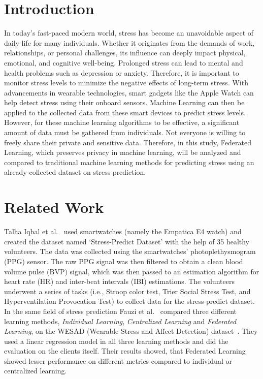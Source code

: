 \documentclass[
   fontsize=10.5pt,
   invert-title=true,
   titlepage=false,
   titleimage-ratio=13,
   class=article,
   twocolumn,
   parskip=half-
]{bfhpub}				%
\begin{document}
\section{Introduction}
In today's fast-paced modern world, stress has become an unavoidable aspect of
daily life for many individuals. Whether it originates from the demands of work,
relationships, or personal challenges, its influence can deeply impact physical,
emotional, and cognitive well-being. Prolonged stress can lead to mental and
health problems such as depression or anxiety. Therefore, it is important to
monitor stress levels to minimize the negative effects of long-term stress. With
advancements in wearable technologies, smart gadgets like the Apple Watch can
help detect stress using their onboard sensors. Machine Learning can then be
applied to the collected data from these smart devices to predict stress levels.
However, for these machine learning algorithms to be effective, a significant
amount of data must be gathered from individuals. Not everyone is willing to
freely share their private and sensitive data. Therefore, in this study,
Federated Learning, which preserves privacy in machine learning, will be
analyzed and compared to traditional machine learning methods for predicting
stress using an already collected dataset on stress prediction.

\section{Related Work}
Talha Iqbal et al.~\cite{iqbal_stress_2022} used smartwatches (namely the
Empatica E4 watch) and created the dataset named `Stress-Predict Dataset' with
the help of 35 healthy volunteers. The data was collected using the smartwatches'
photoplethysmogram (PPG) sensor. The raw PPG signal was then filtered to
obtain a clean blood volume pulse (BVP) signal, which was then passed to an
estimation algorithm for heart rate (HR) and inter-beat intervals (IBI)
estimations. The volunteers underwent a series of tasks (i.e., Stroop color
test, Trier Social Stress Test, and Hyperventilation Provocation Test) to collect
data for the stress-predict dataset. In the same field of stress prediction
Fauzi et al.~\cite{fauzi_comparative_2022} compared three different learning
methods, \textit{Individual Learning}, \textit{Centralized Learning} and
\textit{Federated Learning}, on the WESAD (Wearable Stress and Affect Detection)
dataset~\cite{schmidt_introducing_2018}. They used a linear regression model in
all three learning methods and did the evaluation on the clients itself. Their
results showed, that Federated Learning showed lesser performance on different
metrics compared to individual or centralized learning.
\end{document}
